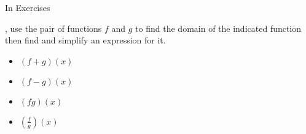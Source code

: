 {\noindent In Exercises}
{, use the pair of functions $f$ and $g$ to find the domain of the indicated function then find and simplify an expression for it.

\begin{multicols}{2}
\begin{itemize}

\item  $(f+g)(x)$
\item  $(f-g)(x)$
\item  $(fg)(x)$
\item  $\left(\frac{f}{g}\right)(x)$

\end{itemize}
\end{multicols}
}
